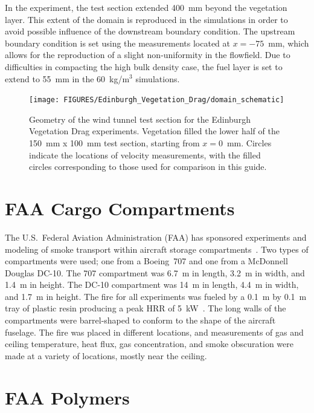 In the experiment, the test section extended 400~mm beyond the vegetation layer. This extent of the domain is reproduced in the simulations in order to avoid possible influence of the downstream boundary condition. The upstream boundary condition is set using the measurements located at $x=-75$~mm, which allows for the reproduction of a slight non-uniformity in the flowfield. Due to difficulties in compacting the high bulk density case, the fuel layer is set to extend to 55~mm in the 60~kg/m$^3$ simulations.

\begin{figure}[ht]
\centering
\texttt{[image: FIGURES/Edinburgh\_Vegetation\_Drag/domain\_schematic]}
\caption[Geometry of the Edinburgh Vegetation Drag experiments]{Geometry of the wind tunnel test section for the Edinburgh Vegetation Drag experiments. Vegetation filled the lower half of the 150~mm x 100~mm test section, starting from $x=0$~mm. Circles indicate the locations of velocity measurements, with the filled circles corresponding to those used for comparison in this guide.}
\label{Ed_Veg_Drag_Layout}
\end{figure}

\section{FAA Cargo Compartments}
\label{FAA_Cargo_Description}

The U.S.~Federal Aviation Administration (FAA) has sponsored experiments and modeling of smoke transport within aircraft storage compartments~\cite{FAA-AR-03-49,FAA-AR-07-27}. Two types of compartments were used; one from a Boeing~707 and one from a McDonnell Douglas DC-10. The 707 compartment was 6.7~m in length, 3.2~m in width, and 1.4~m in height. The DC-10 compartment was 14~m in length, 4.4~m in width, and 1.7~m in height. The fire for all experiments was fueled by a 0.1~m by 0.1~m tray of plastic resin producing a peak HRR of 5~kW~\cite{FAA-AR-06-21}. The long walls of the compartments were barrel-shaped to conform to the shape of the aircraft fuselage. The fire was placed in different locations, and measurements of gas and ceiling temperature, heat flux, gas concentration, and smoke obscuration were made at a variety of locations, mostly near the ceiling.


\section{FAA Polymers}
\label{FAA_Polymers_Description}

